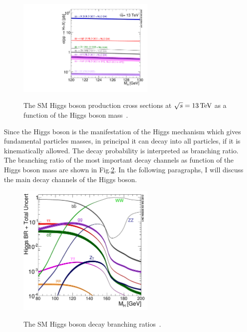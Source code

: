 \begin{figure}[!ht]
  \begin{center}  
    \includegraphics[width=0.6\textwidth]{Fig/plot_13tev_H_sqrt}\\
    \caption{The SM Higgs boson production cross sections at $\sqrt{s}=13\,\text{Te\hspace{-.08em}V}$ as a function of the Higgs boson mass~\cite{LHCHXSWG}.\label{fig:higgsXS}}  
  \end{center}
\end{figure} 

Since the Higgs boson is the manifestation of the Higgs mechanism which gives fundamental particles masses, in principal it can decay into all particles, if it is kinematically allowed. The decay probability is interpreted as branching ratio. The branching ratio of the most important decay channels as function of the Higgs boson mass are shown in Fig.\ref{fig:higgsBR}. In the following paragraphs, I will discuss the main decay channels of the Higgs boson. 

\begin{figure}[!ht]
  \begin{center}  
    \includegraphics[width=0.6\textwidth]{Fig/Higgs_BR_LM}\\
    \caption{The SM Higgs boson decay branching ratios~\cite{LHCHXSWG}. \label{fig:higgsBR}}  
  \end{center}
\end{figure} 

